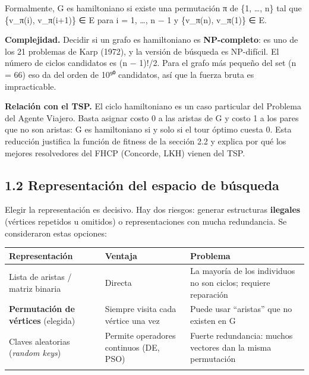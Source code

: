 \documentclass[
  spanish,
  11pt,
]{article}
\newcounter{none} %
\begin{document}
Formalmente, G es hamiltoniano si existe una permutación π de \{1,
\ldots, n\} tal que \{v\_π(i), v\_π(i+1)\} ∈ E para i = 1, \ldots, n − 1
y \{v\_π(n), v\_π(1)\} ∈ E.

\textbf{Complejidad.} Decidir si un grafo es hamiltoniano es
\textbf{NP-completo}: es uno de los 21 problemas de Karp (1972), y la
versión de búsqueda es NP-difícil. El número de ciclos candidatos es (n
− 1)!/2. Para el grafo más pequeño del set (n = 66) eso da del orden de
10⁹⁰ candidatos, así que la fuerza bruta es impracticable.

\textbf{Relación con el TSP.} El ciclo hamiltoniano es un caso
particular del Problema del Agente Viajero. Basta asignar costo 0 a las
aristas de G y costo 1 a los pares que no son aristas: G es hamiltoniano
si y solo si el tour óptimo cuesta 0. Esta reducción justifica la
función de fitness de la sección 2.2 y explica por qué los mejores
resolvedores del FHCP (Concorde, LKH) vienen del TSP.

\subsection{1.2 Representación del espacio de
búsqueda}\label{representaciuxf3n-del-espacio-de-buxfasqueda}

Elegir la representación es decisivo. Hay dos riesgos: generar
estructuras \textbf{ilegales} (vértices repetidos u omitidos) o
representaciones con mucha redundancia. Se consideraron estas opciones:

{\def\LTcaptype{none} %
\begin{center}
\begin{tabular}{@{}
  >{\raggedright\arraybackslash}p{}
  >{\raggedright\arraybackslash}p{}
  >{\raggedright\arraybackslash}p{}@{}}
\toprule\noalign{}
\begin{minipage}[b]{\linewidth}\raggedright
Representación
\end{minipage} & \begin{minipage}[b]{\linewidth}\raggedright
Ventaja
\end{minipage} & \begin{minipage}[b]{\linewidth}\raggedright
Problema
\end{minipage} \\
\midrule\noalign{}
Lista de aristas / matriz binaria & Directa & La mayoría de los
individuos no son ciclos; requiere reparación \\
\textbf{Permutación de vértices} (elegida) & Siempre visita cada vértice
una vez & Puede usar ``aristas'' que no existen en G \\
Claves aleatorias (\emph{random keys}) & Permite operadores continuos
(DE, PSO) & Fuerte redundancia: muchos vectores dan la misma
permutación \\
\bottomrule\noalign{}
\end{tabular}
\end{center}
}
\end{document}
